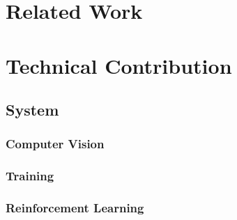 \documentclass{article}
\begin{document}
\section{Related Work}

\section{Technical Contribution}

\subsection{System}

\subsubsection{Computer Vision}
\subsubsection{Training}
\subsubsection{Reinforcement Learning}
\end{document}
